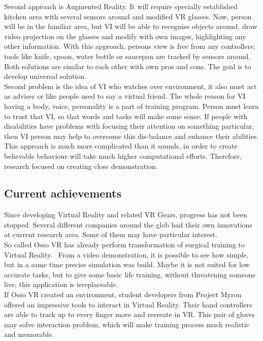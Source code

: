\documentclass[18pt]{article}
\numberwithin{equation}{section} %
\numberwithin{figure}{section} %
\numberwithin{table}{section} %
\begin{document}
		Second approach is Augmented Reality. It will require specially established kitchen area with several sensors around and modified VR glasses. Now, person will be in the familiar area, but VI will be able to recognise objects around, draw video projection on the glasses and modify with own images, highlighting any other information. With this approach, persons view is free from any controllers; tools like knife, spoon, water bottle or saucepan are tracked by sensors around.\\
		Both solutions are similar to each other with own pros and cons. The goal is to develop universal solution. \\
		
		Second problem is the idea of VI who watches over environment, it also must act as adviser or like people used to say a virtual friend. The whole reason for VI having a body, voice, personality is a part of training program. Person must learn to trust that VI, so that words and tasks will make some sense. If people with disabilities have problems with focusing their attention on something particular, then VI person may help to overcome this dis-balance and enhance their abilities. This approach is much more complicated than it sounds, in order to create believable behaviour will take much higher computational efforts. Therefore, research focused on creating close demonstration. \\		
	
	\subsection{Current achievements}		
		Since developing Virtual Reality and related VR Gears, progress has not been stopped. Several different companies around the glob had their own innovations at current research area. Some of them may have particular interest. \\
		
		So called Osso VR has already perform transformation of surgical training to Virtual Reality.~\cite{OssoVR} From a video demonstration, it is possible to see how simple, but in a same time precise simulation was build. Maybe it is not suited for low accurate tasks, but to give some basic life training, without threatening someone live, this application is irreplaceable. \\	
		If Osso VR created an environment, student developers from Project Myron~\cite{Myron} offered an impressive tools to interact in Virtual Reality. Their hand controllers are able to track up to every finger move and recreate in VR. This pair of gloves may solve interaction problem, which will make training process much realistic and memorable. \\
		
\end{document}
